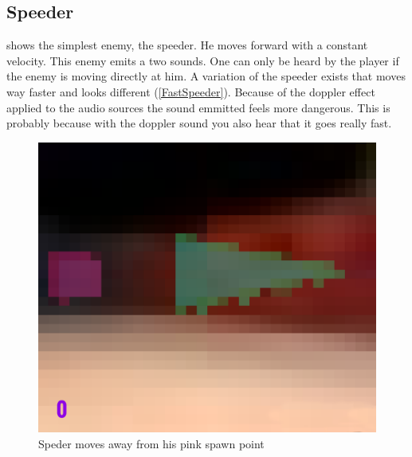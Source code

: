 \subsection{Speeder}
 shows the simplest enemy, the speeder. He moves forward with a constant velocity. This enemy emits a two sounds. One can only be heard by the player if the enemy is moving directly at him. A variation of the speeder exists that moves way faster and looks different (\cref{FastSpeeder}). Because of the doppler effect applied to the audio sources the sound emmitted feels more dangerous. This is probably because with the doppler sound you also hear that it goes really fast.

\begin{figure}[p]
  \centering
  \includegraphics[width=\imgWidth]{images/game_systems/SpeederSpawns.png}
  \caption{Speder moves away from his pink spawn point}
  \label{Speeder}
\end{figure}

